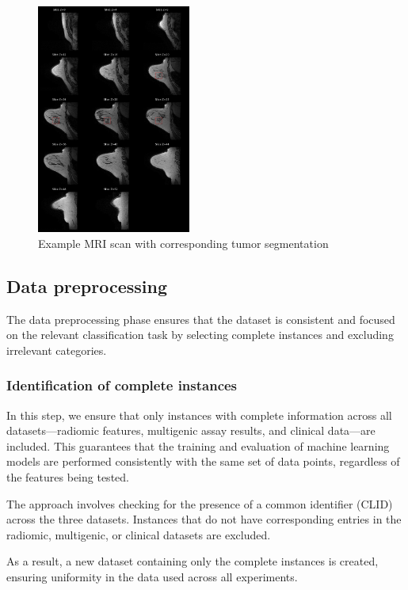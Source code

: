 \documentclass[conference]{IEEEtran}
\begin{document}
\begin{figure}
    \centering
    \includegraphics[width=0.45\textwidth]{images/mri_example.png}
    \caption{Example MRI scan with corresponding tumor segmentation}
    \label{fig:mri_example}
\end{figure}

\subsection{Data preprocessing}

The data preprocessing phase ensures that the dataset is consistent and focused on the relevant classification task by selecting complete instances and excluding irrelevant categories.

\subsubsection{Identification of complete instances}

In this step, we ensure that only instances with complete information across all datasets—radiomic features, multigenic assay results, and clinical data—are included. This guarantees that the training and evaluation of machine learning models are performed consistently with the same set of data points, regardless of the features being tested.

The approach involves checking for the presence of a common identifier (CLID) across the three datasets. Instances that do not have corresponding entries in the radiomic, multigenic, or clinical datasets are excluded.

As a result, a new dataset containing only the complete instances is created, ensuring uniformity in the data used across all experiments.
\end{document}
